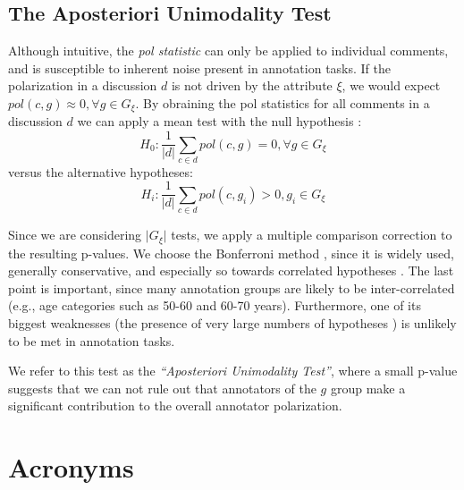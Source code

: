 \documentclass{article}
\begin{document}
\subsection{The Aposteriori Unimodality Test}
\label{ssec:methodology:aposteriori}

Although intuitive, the \textit{pol statistic} can only be applied to individual comments, and is susceptible to inherent noise present in annotation tasks. If the polarization in a discussion $d$ is not driven by the attribute $\xi$, we would expect $pol(c, g) \approx 0,  \forall g \in G_{\xi}$. By obraining the pol statistics for all comments in a discussion $d$ we can apply a mean test with the null hypothesis :
\begin{equation}
	H_0: \frac{1}{\lvert d \rvert} \sum\limits_{c \in d} pol(c, g) = 0, \forall g \in G_{\xi}
\end{equation}
\noindent versus the alternative hypotheses: 
\begin{equation}
	H_i:  \frac{1}{\lvert d \rvert} \sum\limits_{c \in d}  pol(c, g_i) > 0, g_i \in G_{\xi}
\end{equation}

Since we are considering $\lvert G_{\xi} \rvert$ tests, we apply a multiple comparison correction to the resulting p-values. We choose the Bonferroni method \parencite{Bland170}, since it is widely used, generally conservative, and especially so towards correlated hypotheses \parencite{ChenFengYi2017}. The last point is important, since many annotation groups are likely to be inter-correlated (e.g., age categories such as 50-60 and 60-70 years). Furthermore, one of its biggest weaknesses (the presence of very large numbers of hypotheses \parencite{ChenFengYi2017}) is unlikely to be met in annotation tasks.

We refer to this test as the \textit{``Aposteriori Unimodality Test''}, where a small p-value suggests that we can not rule out that annotators of the $g$ group make a significant contribution to the overall annotator polarization.


\section{Acronyms}

\begin{acronym}[WWW]
\end{acronym}

\printbibliography
\end{document}
